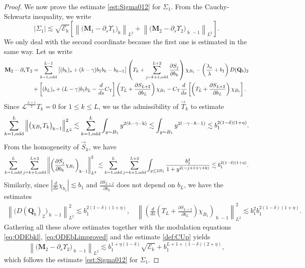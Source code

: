 \documentclass[11pt]{aims}
\theoremstyle{definition}
\numberwithin{equation}{section}
\begin{document}
\begin{proof}
We now prove the estimate \eqref{est:Sigma012} for $\Sigma_1$. From the Cauchy-Schwartz inequality, we write
$$|\Sigma_1| \lesssim \sqrt{{\mathscr{E}}_\Bbbk}\left[ \left\| \big(\mathbf{M}_1 - {\partial_s} \Upsilon_1 \big)_\Bbbk\right \|_{L^2} + \left\| \big(\mathbf{M}_2 - {\partial_s} \Upsilon_2 \big)_{\Bbbk - 1}\right \|_{L^2} \right].$$
We only deal with the second coordinate because the first one is estimated in the same way. Let us write 
\begin{align*}
\mathbf{M}_2 - {\partial_s} \Upsilon_2 & = \sum_{k = 1, \textup{odd}}^{L - 1} \big[(b_k)_s + (k - \gamma)b_1b_k - b_{k - 1}\big]\left(T_k + \sum_{j = k + 1, \textup{odd}}^{L + 2}\frac{\partial S_{j}}{\partial b_k}\right) \chi_{B_1} - \left(\frac{\lambda_s}{\lambda} + b_1\right)D(\mathbf{Q}_b)_2\\
& + \left[(b_L)_s + (L - \gamma)b_1b_L - \frac{d}{ds}C_\Upsilon\right]\left(T_L + \frac{\partial S_{L+2}}{\partial b_L} \right)\chi_{B_1} - C_\Upsilon \frac{d}{ds}\left[\left(T_L + \frac{\partial S_{L+2}}{\partial b_L} \right)\chi_{B_1} \right].
\end{align*}
Since ${\mathscr{L}}^{\frac{L+1}{2}}T_k = 0$ for $1 \leq k \leq L$, we us the admissibility of $\vec T_k$ to estimate 
$$\sum_{k = 1, \textup{odd}}^L \left\|\big(\chi_{B_1}T_k\big)_{\Bbbk - 1}\right\|_{L^2}^2 \lesssim \sum_{k = 1, \textup{odd}}^L \int_{y \sim B_1}y^{2(k - \gamma - \Bbbk)} \lesssim \int_{y \sim B_1}y^{2(-\gamma - \hbar -1)} \lesssim b_1^{2(1 - \delta)(1 + \eta)}.$$
From the homogeneity of $\vec S_k$, we have
$$\sum_{k = 1, \textup{odd}}^{L}\sum_{j = k + 1, \textup{odd}}^{L + 2}\left\| \left(\frac{\partial S_{j}}{\partial b_k} \chi_{B_1}\right)_{\Bbbk - 1}\right\|_{L^2}^2 \lesssim \sum_{k = 1, \textup{odd}}^{L}\sum_{j = k + 1, \textup{odd}}^{L + 2} \int_{y \leq 2B_1}\frac{b_1^4}{1 + y^{2(-j + 1 + \gamma + \Bbbk)}}\lesssim b_1^{2(1 - \delta)(1 + \eta)}.$$
Similarly, since $\left|\frac{d}{ds}\chi_{b_1}\right| \lesssim b_1$ and $\frac{\partial S_{L+2}}{\partial b_L}$ does not depend on $b_L$, we have the estimates 
\begin{align*}
\left\|\big(D(\mathbf{Q}_b)_2 \big)_{\Bbbk - 1} \right\|^2_{L^2} \lesssim b_1^{2(1 - \delta)(1 + \eta)}, \quad \left\|\left(\frac{d}{ds}\left(T_L + \frac{\partial S_{L+2}}{\partial b_L} \right)\chi_{B_1} \right)_{\Bbbk - 1} \right\|_{L^2}^2 \lesssim b_1^2b_1^{2(1 - \delta)(1 + \eta)}.
\end{align*}
Gathering all these above estimates together with the modulation equations \eqref{eq:ODEbkl}, \eqref{eq:ODEbLimproved} and the estimate \eqref{def:CUp} yields
\begin{equation}\label{est:M2Up2}
\left\| \big(\mathbf{M}_2 - {\partial_s} \Upsilon_2 \big)_{\Bbbk - 1}\right \|_{L^2} \lesssim b_1^{1 + \eta(1 - \delta)}\sqrt{{\mathscr{E}}_\Bbbk} + b_1^{L + 1 + (1 - \delta)(2 + \eta)},
\end{equation}
which follows the estimate \eqref{est:Sigma012} for $\Sigma_1$.


\end{proof}
\end{document}
